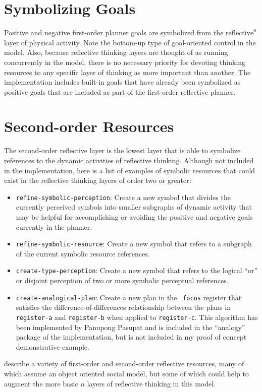 \section{Symbolizing Goals}

Positive and negative first-order planner goals are symbolized from
the $\text{reflective}^0$ layer of physical activity.  Note the
bottom-up type of goal-oriented control in the model.  Also, because
reflective thinking layers are thought of as running concurrently in
the model, there is no necessary priority for devoting thinking
resources to any specific layer of thinking as more important than
another.  The implementation includes built-in goals that have already
been symbolized as positive goals that are included as part of the
first-order reflective planner.

\section{Second-order Resources}

The second-order reflective layer is the lowest layer that is able to
symbolize references to the dynamic activities of reflective thinking.
Although not included in the implementation, here is a list of
examples of symbolic resources that could exist in the reflective
thinking layers of order two or greater:
\begin{itemize}
\item {\tt refine-symbolic-perception}: Create a new symbol that
  divides the currently perceived symbols into smaller subgraphs of
  dynamic activity that may be helpful for accomplishing or avoiding
  the positive and negative goals currently in the planner.
\item {\tt refine-symbolic-resource}: Create a new symbol that refers
  to a subgraph of the current symbolic resource references.
\item {\tt create-type-perception}: Create a new symbol that refers to
  the logical ``or'' or disjoint perception of two or more symbolic
  perceptual references.
\item {\tt create-analogical-plan}: Create a new plan in the {\tt
  focus} register that satisfies the \cite{winston:1970}
  difference-of-differences relationship between the plans in {\tt
    register-a} and {\tt register-b} when applied to {\tt register-c}.
  This algorithm has been implemented by Panupong Pasupat and is
  included in the ``analogy'' package of the implementation, but is
  not included in my proof of concept demonstrative example.
\end{itemize}
\cite{singh:2003, singh:2005a} describe a variety of first-order and
second-order reflective resources, many of which assume an object
oriented social model, but some of which could help to augment the
more basic $n$ layers of reflective thinking in this model.


